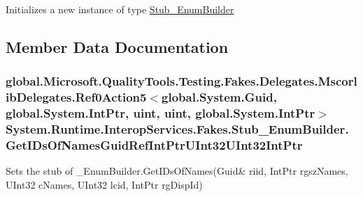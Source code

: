 Initializes a new instance of type \hyperlink{class_system_1_1_runtime_1_1_interop_services_1_1_fakes_1_1_stub___enum_builder}{Stub\-\_\-\-Enum\-Builder}



\subsection{Member Data Documentation}
\hypertarget{class_system_1_1_runtime_1_1_interop_services_1_1_fakes_1_1_stub___enum_builder_a940241d6ab27aa7ac06698d7c853e757}{
\subsubsection[{Get\-I\-Ds\-Of\-Names\-Guid\-Ref\-Int\-Ptr\-U\-Int32\-U\-Int32\-Int\-Ptr}]{\setlength{\rightskip}{0pt plus 5cm}global.\-Microsoft.\-Quality\-Tools.\-Testing.\-Fakes.\-Delegates.\-Mscorlib\-Delegates.\-Ref0\-Action5$<$global.\-System.\-Guid, global.\-System.\-Int\-Ptr, uint, uint, global.\-System.\-Int\-Ptr$>$ System.\-Runtime.\-Interop\-Services.\-Fakes.\-Stub\-\_\-\-Enum\-Builder.\-Get\-I\-Ds\-Of\-Names\-Guid\-Ref\-Int\-Ptr\-U\-Int32\-U\-Int32\-Int\-Ptr}}\label{class_system_1_1_runtime_1_1_interop_services_1_1_fakes_1_1_stub___enum_builder_a940241d6ab27aa7ac06698d7c853e757}


Sets the stub of \-\_\-\-Enum\-Builder.\-Get\-I\-Ds\-Of\-Names(Guid\& riid, Int\-Ptr rgsz\-Names, U\-Int32 c\-Names, U\-Int32 lcid, Int\-Ptr rg\-Disp\-Id)

